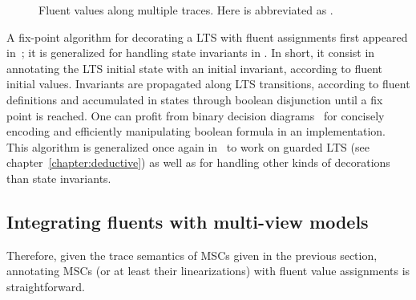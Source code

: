 \begin{figure}[H]\centering
{}
\caption{Fluent values along multiple traces. Here  is abbreviated as .\label{image:fluent-values-along-multiple-traces}}
\end{figure}

A fix-point algorithm for decorating a LTS with fluent assignments first appeared in~\cite{Damas:2005}; it is generalized for handling state invariants in \cite{Damas:2009}. In short, it consist in annotating the LTS initial state with an initial invariant, according to fluent initial values. Invariants are propagated along LTS transitions, according to fluent definitions and accumulated in states through boolean disjunction until a fix point is reached. One can profit from binary decision diagrams~\cite{Bryant:1986} for concisely encoding and efficiently manipulating boolean formula in an implementation. This algorithm is generalized once again in~\cite{Damas:2011} to work on guarded LTS (see chapter~\ref{chapter:deductive}) as well as for handling other kinds of decorations than state invariants.

\subsection{Integrating fluents with multi-view models}

Therefore, given the trace semantics of MSCs given in the previous section, annotating MSCs (or at least their linearizations) with fluent value assignments is straightforward. 
